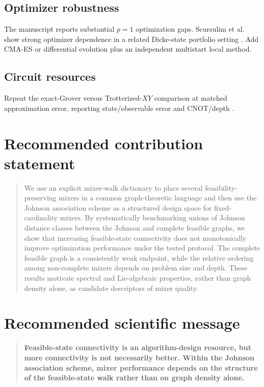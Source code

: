 \documentclass[11pt]{article}
\begin{document}
\subsection{Optimizer robustness}
The manuscript reports substantial $p=1$ optimization gaps. Scursulim et al. show strong optimizer dependence in a related Dicke-state portfolio setting \cite{Scursulim2026}. Add CMA-ES or differential evolution plus an independent multistart local method.

\subsection{Circuit resources}
Repeat the exact-Grover versus Trotterized-$XY$ comparison at matched approximation error, reporting state/observable error and CNOT/depth \cite{He2023,Awasthi2026Trotter}.

\section{Recommended contribution statement}
\begin{quote}
We use an explicit mixer-walk dictionary to place several feasibility-preserving mixers in a common graph-theoretic language and then use the Johnson association scheme as a structured design space for fixed-cardinality mixers. By systematically benchmarking unions of Johnson distance classes between the Johnson and complete feasible graphs, we show that increasing feasible-state connectivity does not monotonically improve optimization performance under the tested protocol. The complete feasible graph is a consistently weak endpoint, while the relative ordering among non-complete mixers depends on problem size and depth. These results motivate spectral and Lie-algebraic properties, rather than graph density alone, as candidate descriptors of mixer quality.
\end{quote}

\section{Recommended scientific message}
\begin{quote}
\textbf{Feasible-state connectivity is an algorithm-design resource, but more connectivity is not necessarily better. Within the Johnson association scheme, mixer performance depends on the structure of the feasible-state walk rather than on graph density alone.}
\end{quote}
\end{document}
